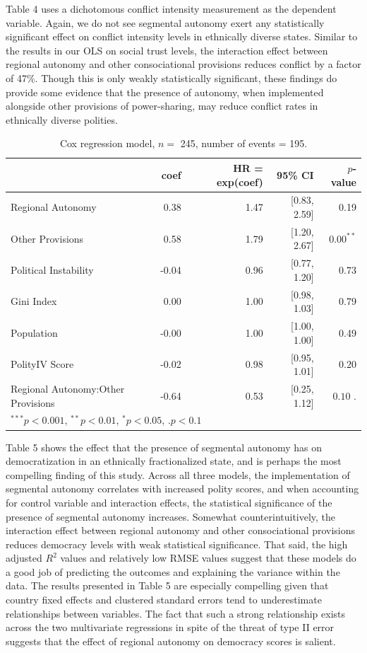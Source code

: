 \documentclass[12pt]{article}
\begin{document}
Table 4 uses a dichotomous conflict intensity measurement as the dependent variable. Again, we do not see segmental autonomy exert any statistically significant effect on conflict intensity levels in ethnically diverse states. Similar to the results in our OLS on social trust levels, the interaction effect between regional autonomy and other consociational provisions reduces conflict by a factor of 47\%. Though this is only weakly statistically significant, these findings do provide some evidence that the presence of autonomy, when implemented alongside other provisions of power-sharing, may reduce conflict rates in ethnically diverse polities. 

\begin{table}[!htbp]
	\centering
	\begin{tabular}{lrrrr}
		\hline
		& coef & HR = exp(coef) & 95\% CI & $p$-value \\ 
		\hline
		Regional Autonomy & 0.38 & 1.47 & [0.83, 2.59] & 0.19 \\ 
		Other Provisions & 0.58 & 1.79 & [1.20, 2.67] & $0.00^{**}$ \\ 
		Political Instability & -0.04 & 0.96 & [0.77, 1.20] & 0.73 \\ 
		Gini Index & 0.00 & 1.00 & [0.98, 1.03] & 0.79 \\ 
		Population & -0.00 & 1.00 & [1.00, 1.00] & 0.49 \\ 
		PolityIV Score & -0.02 & 0.98 & [0.95, 1.01] & 0.20 \\ 
		Regional Autonomy:Other Provisions & -0.64 & 0.53 & [0.25, 1.12] & $0.10 {\textbf{ .}}$ \\ 
		\hline
		\multicolumn{4}{l}{\scriptsize{$^{***}p<0.001$, $^{**}p<0.01$, $^*p<0.05$, $\textbf{.}p<0.1$}}
	\end{tabular}
	\caption{Cox regression model, $n = $ 245, number of events = 195.} 
	\label{mod}
\end{table}

Table 5 shows the effect that the presence of segmental autonomy has on democratization in an ethnically fractionalized state, and is perhaps the most compelling finding of this study. Across all three models, the implementation of segmental autonomy correlates with increased polity scores, and when accounting for control variable and interaction effects, the statistical significance of the presence of segmental autonomy increases. Somewhat counterintuitively, the interaction effect between regional autonomy and other consociational provisions reduces democracy levels with weak statistical significance. That said, the high adjusted $R^2$ values and relatively low RMSE values suggest that these models do a good job of predicting the outcomes and explaining the variance within the data. The results presented in Table 5 are especially compelling given that country fixed effects and clustered standard errors tend to underestimate relationships between variables. The fact that such a strong relationship exists across the two multivariate regressions in spite of the threat of type II error suggests that the effect of regional autonomy on democracy scores is salient.  
\end{document}
